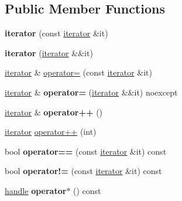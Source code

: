 \subsection*{Public Member Functions}
\begin{DoxyCompactItemize}
\item 
{\bfseries iterator} (const \hyperlink{classiterator}{iterator} \&it)\hypertarget{classiterator_a6be5b7b6c74328b07f4685ce017fd95e}{}\label{classiterator_a6be5b7b6c74328b07f4685ce017fd95e}

\item 
{\bfseries iterator} (\hyperlink{classiterator}{iterator} \&\&it)\hypertarget{classiterator_afc8545755eb549b0e33cabdf53836788}{}\label{classiterator_afc8545755eb549b0e33cabdf53836788}

\item 
\hyperlink{classiterator}{iterator} \& \hyperlink{classiterator_abe044a3aecffb487174e74beda1d66ef}{operator=} (const \hyperlink{classiterator}{iterator} \&it)
\item 
\hyperlink{classiterator}{iterator} \& {\bfseries operator=} (\hyperlink{classiterator}{iterator} \&\&it) noexcept\hypertarget{classiterator_a749ff52914d89d9e7757e25f292d6dcb}{}\label{classiterator_a749ff52914d89d9e7757e25f292d6dcb}

\item 
\hyperlink{classiterator}{iterator} \& {\bfseries operator++} ()\hypertarget{classiterator_a4adf5ce6a7bb9704511805c89b79684d}{}\label{classiterator_a4adf5ce6a7bb9704511805c89b79684d}

\item 
\hyperlink{classiterator}{iterator} \hyperlink{classiterator_a49f48e4e587336b7fa48d609ee8f1779}{operator++} (int)
\item 
bool {\bfseries operator==} (const \hyperlink{classiterator}{iterator} \&it) const \hypertarget{classiterator_a183241fc75640564993ccb290ed2340d}{}\label{classiterator_a183241fc75640564993ccb290ed2340d}

\item 
bool {\bfseries operator!=} (const \hyperlink{classiterator}{iterator} \&it) const \hypertarget{classiterator_a7f93a38ea59f7b8e87ed526d6d952141}{}\label{classiterator_a7f93a38ea59f7b8e87ed526d6d952141}

\item 
\hyperlink{classhandle}{handle} {\bfseries operator$\ast$} () const \hypertarget{classiterator_ae4509402254384f5f164db70431ef2c5}{}\label{classiterator_ae4509402254384f5f164db70431ef2c5}

\end{DoxyCompactItemize}
